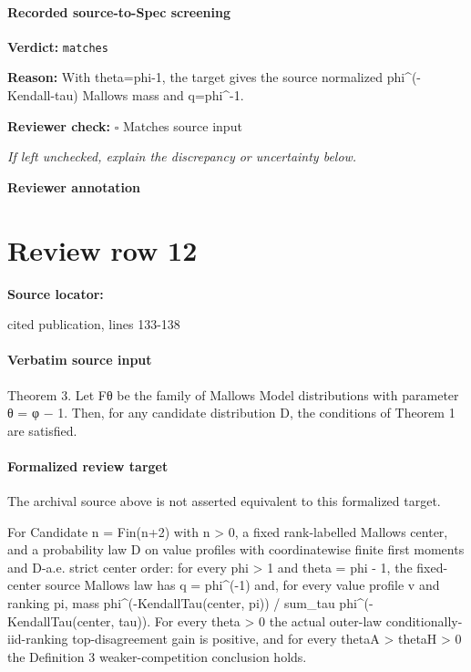 \documentclass[10pt]{article}
\newcommand{\reviewerbox}{%
  \par\noindent\fbox{\parbox{0.96\linewidth}{\rule{0pt}{0.38in}}}\par
}
\newcommand{\reviewmatch}[1]{%
  \par\noindent\textbf{Reviewer check:} $\square$\; #1\par
  \noindent\emph{If left unchecked, explain the discrepancy or uncertainty below.}\par
}
\begin{document}
\paragraph{Recorded source-to-Spec screening}
\textbf{Verdict:} \texttt{matches}
\\
{\raggedright
\textbf{Reason:} With theta=phi-\allowbreak{}1, the target gives the source normalized phi\textasciicircum{}(-\allowbreak{}Kendall-\allowbreak{}tau) Mallows mass and q=phi\textasciicircum{}-\allowbreak{}1.\allowbreak{}
\par}
\reviewmatch{Matches source input}
\noindent\textbf{Reviewer annotation}\par
\reviewerbox
\clearpage
\hypertarget{source-claim-fd702590ac30f669}{}
\section*{Review row 12}
\textbf{Source locator:} {\footnotesize\raggedright cited publication, lines 133-\allowbreak{}138\par}
\paragraph{Verbatim source input}
\begin{ReviewVerbatim}
Theorem 3. Let Fθ be the family of Mallows Model distributions with parameter θ = φ − 1. Then, for any
candidate distribution D, the conditions of Theorem 1 are satisfied.
\end{ReviewVerbatim}


\paragraph{Formalized review target}
The archival source above is not asserted equivalent to this formalized target.
\begin{ReviewVerbatim}
For Candidate n = Fin(n+2) with n > 0, a fixed rank-labelled Mallows center, and a probability law D on value profiles with coordinatewise finite first moments and D-a.e. strict center order: for every phi > 1 and theta = phi - 1, the fixed-center source Mallows law has q = phi^(-1) and, for every value profile v and ranking pi, mass phi^(-KendallTau(center, pi)) / sum_tau phi^(-KendallTau(center, tau)). For every theta > 0 the actual outer-law conditionally-iid-ranking top-disagreement gain is positive, and for every thetaA > thetaH > 0 the Definition 3 weaker-competition conclusion holds.
\end{ReviewVerbatim}
\end{document}
